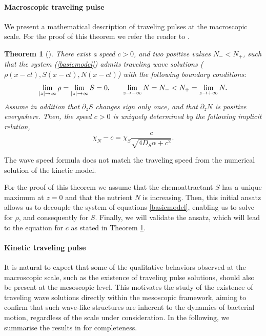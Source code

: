 \documentclass[11pt,twoside]{article}
\numberwithin{equation}{section}
\theoremstyle{plain}
\newtheorem{theorem}{Theorem}[section]
\theoremstyle{nonumberplain}
\begin{document}
\paragraph{Macroscopic traveling pulse}
We present a mathematical description of traveling pulses at the macroscopic scale. For the proof of this theorem we refer the reader to \cite{calvez2019chemotactic}.

\begin{theorem}[\cite{calvez2019chemotactic}]\label{thmacro}
There exist a speed $c>0$, and two positive values $N_- < N_+$, such that the system (\ref{basicmodel}) admits traveling wave solutions ($\rho (x- c t), S(x - c t), N(x - c t)$) with the following boundary conditions:
\begin{equation}
    \lim_{|z| \to \infty} \rho = \lim_{|z| \to \infty} S = 0, \hspace{0.6cm} \lim_{z \to -\infty} N = N_- < N_+ = \lim_{z \to + \infty} N.
    \nonumber
\end{equation}
Assume in addition that $\partial_z S$ changes sign only once, and that $\partial_z N$ is positive everywhere. Then, the speed $c > 0$ is uniquely determined by the following implicit relation,
\[
\chi_N - c = \chi_S \frac{c}{\sqrt{4 D_S \alpha + c^2}}.
\]
\end{theorem}
{\color{red} The wave speed formula does not match the traveling speed from the numerical solution of the kinetic model.}

For the proof of this theorem we assume that the chemoattractant $S$ has a unique maximum at $z = 0$ and that the nutrient $N$ is increasing. Then, this initial ansatz allows us to decouple the system of equations \eqref{basicmodel}, enabling us to solve for $\rho$, and consequently for $S$. Finally, we will validate the ansatz, which will lead to the equation for $c$ as stated in Theorem \ref{thmacro}.

\paragraph{Kinetic traveling pulse} It is natural to expect that some of the qualitative behaviors observed at the macroscopic scale, such as the existence of traveling pulse solutions, should also be present at the mesoscopic level. This motivates the study of the existence of traveling wave solutions directly within the mesoscopic framework, aiming to confirm that such wave-like structures are inherent to the dynamics of bacterial motion, regardless of the scale under consideration.
In the following, we summarise the results in \cite{calvez2019chemotactic} for completeness.
\end{document}
